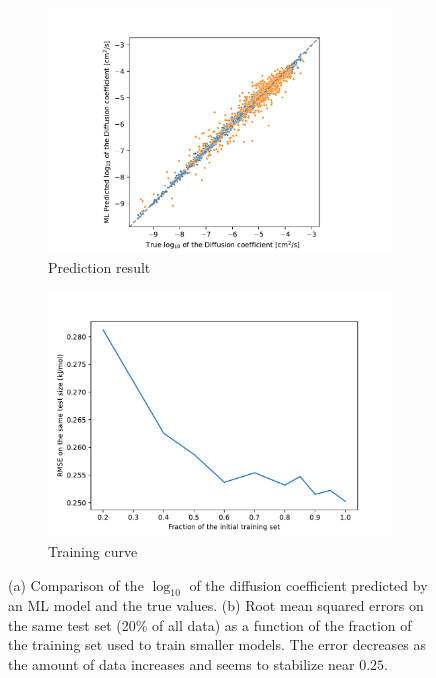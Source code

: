 \documentclass[main]{subfiles}
\begin{document}
\begin{figure}[ht]
  \centering
  \begin{subfigure}[b]{0.48\textwidth}
    \centering
    \includegraphics[width=\textwidth]{figures/5-diffusion/diffusion_prediction.pdf}
  \caption{Prediction result}\label{fgr:diffusion_pred}
  \end{subfigure}
  \begin{subfigure}[b]{0.48\textwidth}
    \centering
    \includegraphics[width=\textwidth]{figures/5-diffusion/training_curve.pdf}
    \caption{Training curve}\label{fgr:training_curve_diff}
  \end{subfigure}
    \caption{ (a) Comparison of the $\log_{10}$ of the diffusion coefficient predicted by an ML model and the true values. (b) Root mean squared errors on the same test set (20\% of all data) as a function of the fraction of the training set used to train smaller models. The error decreases as the amount of data increases and seems to stabilize near $0.25$. }
\end{figure}
\end{document}
